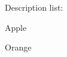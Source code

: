 \noindent Description list:
\par
\begin{description}[itemsep=0pt,parsep=0pt] %
  \item[XX] Apple
  \item[AAA] Orange
\end{description}